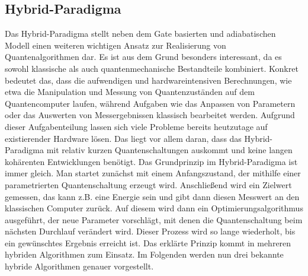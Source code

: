 \subsection{Hybrid-Paradigma}
Das Hybrid-Paradigma stellt neben dem Gate basierten und adiabatischen Modell einen weiteren wichtigen Ansatz zur Realisierung von Quantenalgorithmen dar. Es ist aus dem Grund besonders interessant, da es sowohl klassische als auch quantenmechanische Bestandteile kombiniert. Konkret bedeutet das, dass die aufwendigen und hardwareintensiven Berechnungen, wie etwa die Manipulation und Messung von Quantenzuständen auf dem Quantencomputer laufen, während Aufgaben wie das Anpassen von Parametern oder das Auswerten von Messergebnissen klassisch bearbeitet werden. Aufgrund dieser Aufgabenteilung lassen sich viele Probleme bereits heutzutage auf existierender Hardware lösen. Das liegt vor allem daran, dass das Hybrid-Paradigma mit relativ kurzen Quantenschaltungen auskommt und keine langen kohärenten Entwicklungen benötigt.
Das Grundprinzip im Hybrid-Paradigma ist immer gleich. Man startet zunächst mit einem Anfangszustand, der mithilfe einer parametrierten Quantenschaltung erzeugt wird. Anschließend wird ein Zielwert gemessen, das kann z.B. eine Energie sein und gibt dann diesen Messwert an den klassischen Computer zurück. Auf diesem wird dann ein Optimierungsalgorithmus ausgeführt, der neue Parameter vorschlägt, mit denen die Quantenschaltung beim nächsten Durchlauf verändert wird. Dieser Prozess wird so lange wiederholt, bis ein gewünschtes Ergebnis erreicht ist. Das erklärte Prinzip kommt in mehreren hybriden Algorithmen zum Einsatz. Im Folgenden werden nun drei bekannte hybride Algorithmen genauer vorgestellt. 
